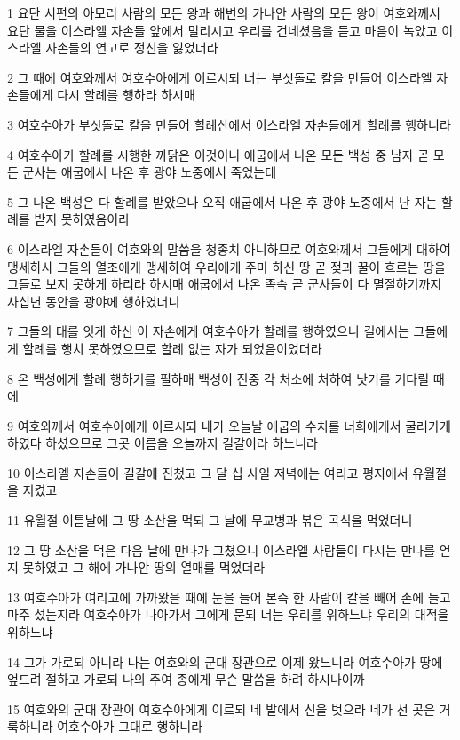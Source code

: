 \par 1 요단 서편의 아모리 사람의 모든 왕과 해변의 가나안 사람의 모든 왕이 여호와께서 요단 물을 이스라엘 자손들 앞에서 말리시고 우리를 건네셨음을 듣고 마음이 녹았고 이스라엘 자손들의 연고로 정신을 잃었더라
\par 2 그 때에 여호와께서 여호수아에게 이르시되 너는 부싯돌로 칼을 만들어 이스라엘 자손들에게 다시 할례를 행하라 하시매
\par 3 여호수아가 부싯돌로 칼을 만들어 할례산에서 이스라엘 자손들에게 할례를 행하니라
\par 4 여호수아가 할례를 시행한 까닭은 이것이니 애굽에서 나온 모든 백성 중 남자 곧 모든 군사는 애굽에서 나온 후 광야 노중에서 죽었는데
\par 5 그 나온 백성은 다 할례를 받았으나 오직 애굽에서 나온 후 광야 노중에서 난 자는 할례를 받지 못하였음이라
\par 6 이스라엘 자손들이 여호와의 말씀을 청종치 아니하므로 여호와께서 그들에게 대하여 맹세하사 그들의 열조에게 맹세하여 우리에게 주마 하신 땅 곧 젖과 꿀이 흐르는 땅을 그들로 보지 못하게 하리라 하시매 애굽에서 나온 족속 곧 군사들이 다 멸절하기까지 사십년 동안을 광야에 행하였더니
\par 7 그들의 대를 잇게 하신 이 자손에게 여호수아가 할례를 행하였으니 길에서는 그들에게 할례를 행치 못하였으므로 할례 없는 자가 되었음이었더라
\par 8 온 백성에게 할례 행하기를 필하매 백성이 진중 각 처소에 처하여 낫기를 기다릴 때에
\par 9 여호와께서 여호수아에게 이르시되 내가 오늘날 애굽의 수치를 너희에게서 굴러가게 하였다 하셨으므로 그곳 이름을 오늘까지 길갈이라 하느니라
\par 10 이스라엘 자손들이 길갈에 진쳤고 그 달 십 사일 저녁에는 여리고 평지에서 유월절을 지켰고
\par 11 유월절 이튿날에 그 땅 소산을 먹되 그 날에 무교병과 볶은 곡식을 먹었더니
\par 12 그 땅 소산을 먹은 다음 날에 만나가 그쳤으니 이스라엘 사람들이 다시는 만나를 얻지 못하였고 그 해에 가나안 땅의 열매를 먹었더라
\par 13 여호수아가 여리고에 가까왔을 때에 눈을 들어 본즉 한 사람이 칼을 빼어 손에 들고 마주 섰는지라 여호수아가 나아가서 그에게 묻되 너는 우리를 위하느냐 우리의 대적을 위하느냐
\par 14 그가 가로되 아니라 나는 여호와의 군대 장관으로 이제 왔느니라 여호수아가 땅에 엎드려 절하고 가로되 나의 주여 종에게 무슨 말씀을 하려 하시나이까
\par 15 여호와의 군대 장관이 여호수아에게 이르되 네 발에서 신을 벗으라 네가 선 곳은 거룩하니라 여호수아가 그대로 행하니라

